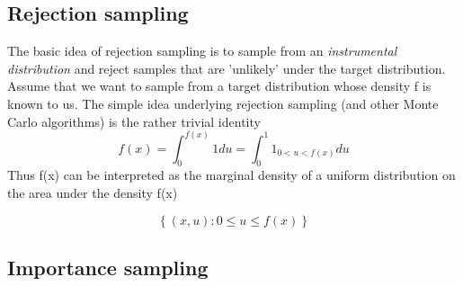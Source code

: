 \documentclass[a4paper,10pt]{article}
\newcommand{\lt}{<}
\begin{document}
 \subsection{Rejection sampling}
 The basic idea of rejection sampling is to sample from an \textit{instrumental distribution} and reject samples
 that are 'unlikely' under the target distribution.
    Assume that we want to sample from a target distribution whose density f is known to us. The simple idea
    underlying rejection sampling (and other Monte Carlo algorithms) is the rather trivial identity
    \begin{equation*}
     f(x) = \int^{f(x)}_{0} 1 du = \int^1_0 1 _{0\lt u \lt f(x)} du
    \end{equation*}
Thus f(x) can be interpreted as the marginal density of a uniform distribution on the area under the density f(x)
\begin{center}
\begin{equation*}
 \left\lbrace (x,u):0\leq u\leq f(x)\right\rbrace
\end{equation*}\end{center}

 \subsection{Importance sampling}
\end{document}

